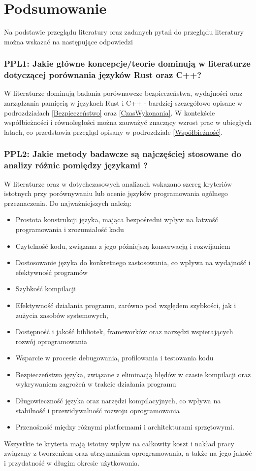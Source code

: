 \section{Podsumowanie}
Na podstawie przeglądu literatury oraz zadanych pytań do przeglądu literatury można wskazać na następujące odpowiedzi
\subsubsection{PPL1: Jakie główne koncepcje/teorie dominują w literaturze dotyczącej porównania języków Rust oraz C++?}
W literaturze dominują badania porównawcze bezpieczeństwa, wydajności oraz zarządzania pamięcią w językach Rust i C++ - bardziej szczegółowo opisane w podrozdziałach \ref{Bezpieczeństwo} oraz \ref{CzasWykonania}. W kontekście współbieżności i równoległości można zauważyć znaczący wzrost prac w ubiegłych latach, co przedstawia przegląd opisany w podrozdziale \ref{Współbieżność}.

\subsubsection{PPL2: Jakie metody badawcze są najczęściej stosowane do analizy różnic pomiędzy językami ?}
W literaturze oraz w dotychczasowych analizach \cite{LanguageComparison_1,LanguageComparison_2,LanguageComparison_3,LanguageComparison_4} wskazano szereg kryteriów istotnych przy porównywaniu lub ocenie języków programowania ogólnego przeznaczenia. Do najważniejszych należą: 
    \begin{itemize}
        \item Prostota konstrukcji języka, mająca bezpośredni wpływ na łatwość programowania i zrozumiałość kodu
        \item Czytelność kodu, związana z jego późniejszą konserwacją i rozwijaniem
        \item Dostosowanie języka do konkretnego zastosowania, co wpływa na wydajność i efektywność programów
        \item Szybkość kompilacji
        \item Efektywność działania programu, zarówno pod względem szybkości, jak i zużycia zasobów systemowych,
        \item Dostępność i jakość bibliotek, frameworków oraz narzędzi wspierających rozwój oprogramowania
        \item Wsparcie w procesie debugowania, profilowania i testowania kodu
        \item Bezpieczeństwo języka, związane z eliminacją błędów w czasie kompilacji oraz wykrywaniem zagrożeń w trakcie działania programu
        \item Długowieczność języka oraz narzędzi kompilacyjnych, co wpływa na stabilność i przewidywalność rozwoju oprogramowania
        \item Przenośność między różnymi platformami i architekturami sprzętowymi.
    \end{itemize}
    Wszystkie te kryteria mają istotny wpływ na całkowity koszt i nakład pracy związany z tworzeniem oraz utrzymaniem oprogramowania, a także na jego jakość i przydatność w długim okresie użytkowania.

